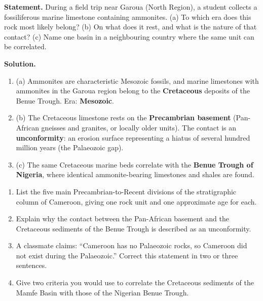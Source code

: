 \documentclass[11pt]{article}
\begin{document}
\begin{exoresolu}
\textbf{Statement.} During a field trip near Garoua (North Region), a student collects a fossiliferous marine limestone containing ammonites. (a) To which era does this rock most likely belong? (b) On what does it rest, and what is the nature of that contact? (c) Name one basin in a neighbouring country where the same unit can be correlated.

\tcblower
\textbf{Solution.}
\begin{enumerate}
\item (a) Ammonites are characteristic Mesozoic fossils, and marine limestones with ammonites in the Garoua region belong to the \textbf{Cretaceous} deposits of the Benue Trough. Era: \textbf{Mesozoic}.
\item (b) The Cretaceous limestone rests on the \textbf{Precambrian basement} (Pan-African gneisses and granites, or locally older units). The contact is an \textbf{unconformity}: an erosion surface representing a hiatus of several hundred million years (the Palaeozoic gap).
\item (c) The same Cretaceous marine beds correlate with the \textbf{Benue Trough of Nigeria}, where identical ammonite-bearing limestones and shales are found.
\end{enumerate}
\end{exoresolu}

\begin{exercice}
\begin{enumerate}
\item List the five main Precambrian-to-Recent divisions of the stratigraphic column of Cameroon, giving one rock unit and one approximate age for each.
\item Explain why the contact between the Pan-African basement and the Cretaceous sediments of the Benue Trough is described as an unconformity.
\item A classmate claims: ``Cameroon has no Palaeozoic rocks, so Cameroon did not exist during the Palaeozoic.'' Correct this statement in two or three sentences.
\item Give two criteria you would use to correlate the Cretaceous sediments of the Mamfe Basin with those of the Nigerian Benue Trough.
\end{enumerate}
\end{exercice}
\end{document}
